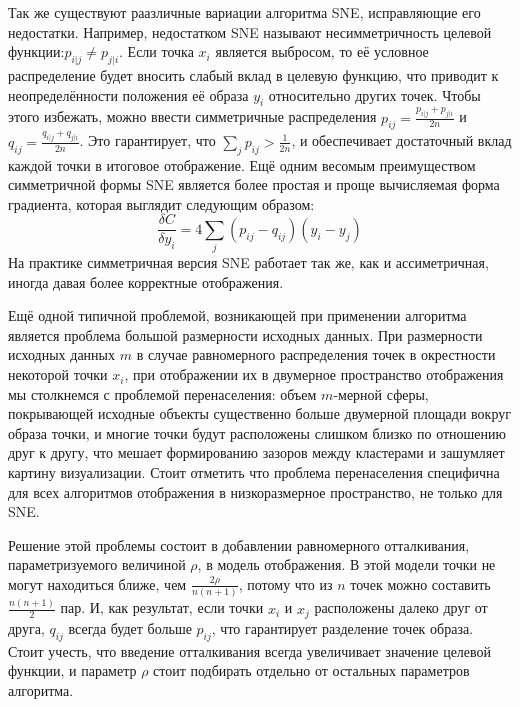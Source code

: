 Так же существуют раазличные вариации алгоритма SNE, исправляющие его недостатки. Например, недостатком SNE называют несимметричность целевой функции:$p_{i|j} \neq p_{j|i}$. Если точка $x_i$ является выбросом, то её условное распределение будет вносить слабый вклад в целевую функцию, что приводит к неопределённости положения её образа $y_i$ относительно других точек. Чтобы этого избежать, можно ввести симметричные распределения $p_{ij} = \frac{p_{i|j} + p_{j|i}}{2n}$ и $q_{ij} = \frac{q_{i|j} + q_{j|i}}{2n}$. Это гарантирует, что $\sum_j p_{ij} > \frac{1}{2n} $, и обеспечивает достаточный вклад каждой точки в итоговое отображение. Ещё одним весомым преимуществом симметричной формы SNE является более простая и проще вычисляемая форма градиента, которая выглядит следующим образом:
\begin{equation}
	\frac{\delta C}{\delta y_i} = 4 \sum_j (p_{ij} - q_{ij})(y_i - y_j)
\end{equation}
На практике симметричная версия SNE работает так же, как и ассиметричная, иногда давая более корректные отображения.

Ещё одной типичной проблемой, возникающей при применении алгоритма является проблема большой размерности исходных данных. При размерности исходных данных $m$ в случае равномерного распределения точек в окрестности некоторой точки $x_i$, при отображении их в двумерное пространство отображения мы столкнемся с проблемой перенаселения: объем $m$-мерной сферы, покрывающей исходные объекты существенно больше двумерной площади вокруг образа точки, и многие точки будут расположены слишком близко по отношению друг к другу, что мешает формированию зазоров между кластерами и зашумляет картину визуализации. Стоит отметить что проблема перенаселения специфична для всех алгоритмов отображения в низкоразмерное пространство, не только для SNE. 

Решение этой проблемы состоит в добавлении равномерного отталкивания, параметризуемого величиной $\rho$, в модель отображения. В этой модели точки не могут находиться ближе, чем $\frac{2 \rho}{n (n + 1)}$, потому что из $n$ точек можно составить $\frac{n (n + 1)}{2}$ пар. И, как результат, если точки $x_i$ и $x_j$ расположены далеко друг от друга, $q_{ij}$ всегда будет больше $p_{ij}$, что гарантирует разделение точек образа. Стоит учесть, что введение отталкивания всегда увеличивает значение целевой функции, и параметр $\rho$ стоит подбирать отдельно от остальных параметров алгоритма.

